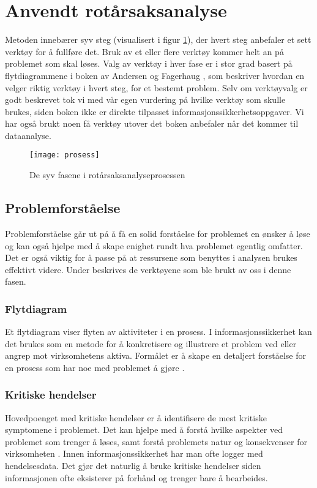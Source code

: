 \section{Anvendt rotårsaksanalyse}
Metoden innebærer syv steg (visualisert i figur \ref{fig:prosess}), der hvert steg anbefaler et sett verktøy for å fullføre det. Bruk av et eller flere verktøy kommer helt an på problemet som skal løses. Valg av verktøy i hver fase er i stor grad basert på flytdiagrammene i boken av Andersen og Fagerhaug \cite{RCA}, som beskriver hvordan en velger riktig verktøy i hvert steg, for et bestemt problem. Selv om verktøyvalg er godt beskrevet tok vi med vår egen vurdering på hvilke verktøy som skulle brukes, siden boken ikke er direkte tilpasset informasjonssikkerhetsoppgaver. Vi har også brukt noen få verktøy utover det boken anbefaler når det kommer til dataanalyse. 

\begin{figure}[H]
    \centering
    \texttt{[image: prosess]}
    \caption[RCA-prosess]{De syv fasene i rotårsaksanalyseprosessen}
    \label{fig:prosess}
\end{figure}

\subsection{Problemforståelse}
Problemforståelse går ut på å få en solid forståelse for problemet en ønsker å løse og kan også hjelpe med å skape enighet rundt hva problemet egentlig omfatter. Det er også viktig for å passe på at ressursene som benyttes i analysen brukes effektivt videre. Under beskrives de verktøyene som ble brukt av oss i denne fasen. 

\subsubsection{Flytdiagram}
Et flytdiagram viser flyten av aktiviteter i en prosess. I informasjonssikkerhet kan det brukes som en metode for å konkretisere og illustrere et problem ved eller angrep mot virksomhetens aktiva. Formålet er å skape en detaljert forståelse for en prosess som har noe med problemet å gjøre \cite{RCA}.

\subsubsection{Kritiske hendelser}
Hovedpoenget med kritiske hendelser er å identifisere de mest kritiske symptomene i problemet. Det kan hjelpe med å forstå hvilke aspekter ved problemet som trenger å løses, samt forstå problemets natur og konsekvenser for virksomheten \cite{RCA}. Innen informasjonssikkerhet har man ofte logger med hendelsesdata. Det gjør det naturlig å bruke kritiske hendelser siden informasjonen ofte eksisterer på forhånd og trenger bare å bearbeides. 

